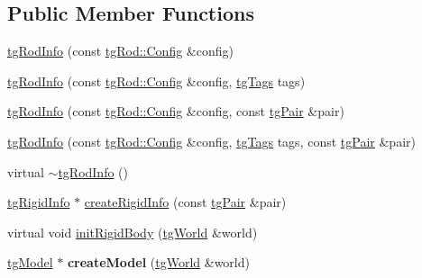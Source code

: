 \subsection*{Public Member Functions}
\begin{DoxyCompactItemize}
\item 
\hyperlink{classtg_rod_info_aa2f3dfb8f7499f9ab12fb545f69b6c22}{tg\-Rod\-Info} (const \hyperlink{structtg_rod_1_1_config}{tg\-Rod\-::\-Config} \&config)
\item 
\hyperlink{classtg_rod_info_ae71e761b2b06a9d7d07aac8990ccaba0}{tg\-Rod\-Info} (const \hyperlink{structtg_rod_1_1_config}{tg\-Rod\-::\-Config} \&config, \hyperlink{classtg_tags}{tg\-Tags} tags)
\item 
\hyperlink{classtg_rod_info_aa16ec8cde5912ea0f91e25c9fd2e3228}{tg\-Rod\-Info} (const \hyperlink{structtg_rod_1_1_config}{tg\-Rod\-::\-Config} \&config, const \hyperlink{classtg_pair}{tg\-Pair} \&pair)
\item 
\hyperlink{classtg_rod_info_a1988041b7d13e40f46c365bd27f68e73}{tg\-Rod\-Info} (const \hyperlink{structtg_rod_1_1_config}{tg\-Rod\-::\-Config} \&config, \hyperlink{classtg_tags}{tg\-Tags} tags, const \hyperlink{classtg_pair}{tg\-Pair} \&pair)
\item 
virtual \hyperlink{classtg_rod_info_abc860600e16a13d6425b576c22869853}{$\sim$tg\-Rod\-Info} ()
\item 
\hyperlink{classtg_rigid_info}{tg\-Rigid\-Info} $\ast$ \hyperlink{classtg_rod_info_adbd0b55b45184f2b7b43130f4835dc1c}{create\-Rigid\-Info} (const \hyperlink{classtg_pair}{tg\-Pair} \&pair)
\item 
virtual void \hyperlink{classtg_rod_info_a9de55488229d7533834d9b67c8a9562c}{init\-Rigid\-Body} (\hyperlink{classtg_world}{tg\-World} \&world)
\item 
\hypertarget{classtg_rod_info_aa0a58573177792e18f0e4d6d23e3d866}{\hyperlink{classtg_model}{tg\-Model} $\ast$ {\bfseries create\-Model} (\hyperlink{classtg_world}{tg\-World} \&world)}\label{classtg_rod_info_aa0a58573177792e18f0e4d6d23e3d866}


\end{DoxyCompactItemize}
